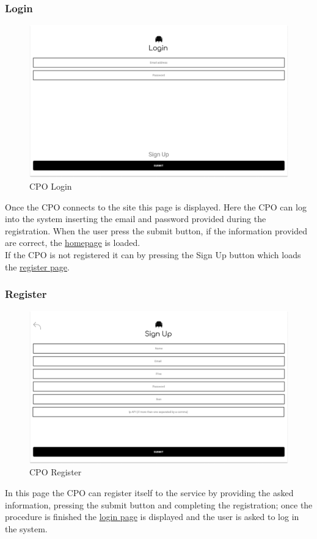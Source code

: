 \subsubsection{Login}
\begin{figure}[H]
    \centering
    \includegraphics[keepaspectratio, width=15cm]{SiteInterface/Login.png}
    \caption{\ac{CPO} Login}
    \label{site:Login}
\end{figure}
Once the \ac{CPO} connects to the site this page is displayed. Here the \ac{CPO} can log into the system inserting the email and password provided during the registration. When the user press the submit button, if the information provided are correct, the \hyperref[site:Homepage]{homepage} is loaded.\\
If the \ac{CPO} is not registered it can by pressing the Sign Up button which loads the \hyperref[site:Register]{register page}.
\subsubsection{Register}
\begin{figure}[H]
    \centering
    \includegraphics[keepaspectratio, width=15cm]{SiteInterface/Register.png}
    \caption{\ac{CPO} Register}
    \label{site:Register}
\end{figure}
In this page the \ac{CPO} can register itself to the service by providing the asked information, pressing the submit button and completing the registration; once the procedure is finished the \hyperref[site:Login]{login page} is displayed and the user is asked to log in the system.
